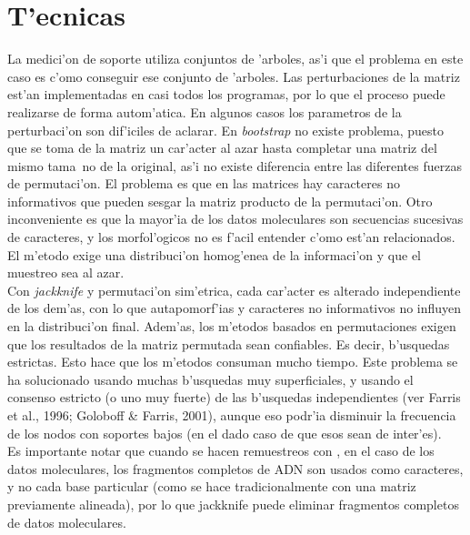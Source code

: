 \section{T'ecnicas}
La medici'on de soporte utiliza conjuntos de 'arboles, as'i que el problema en este caso es c'omo conseguir ese conjunto de 'arboles. Las perturbaciones de la matriz est'an implementadas en casi todos los programas, por lo que el proceso puede realizarse de forma autom'atica. En algunos casos los parametros de la perturbaci'on son dif'iciles de aclarar. En \textit{bootstrap} no existe problema, puesto que se toma de la matriz un car'acter al azar hasta completar una matriz del mismo tama~no de la original, as'i no existe diferencia entre las diferentes fuerzas de permutaci'on. El problema es que en las matrices hay caracteres no informativos que pueden sesgar la matriz producto de la permutaci'on. Otro inconveniente es que la mayor'ia de los datos moleculares son secuencias sucesivas de caracteres, y los morfol'ogicos no es f'acil entender c'omo est'an relacionados. El m'etodo exige una distribuci'on homog'enea de la informaci'on y que el muestreo sea al azar.\\
Con \textit{jackknife} y permutaci'on sim'etrica, cada car'acter es alterado independiente de los dem'as, con lo que autapomorf'ias y caracteres no informativos no influyen en la distribuci'on final. Adem'as, los m'etodos basados en permutaciones exigen que los resultados de la matriz permutada sean confiables. Es decir, b'usquedas estrictas. Esto hace que los m'etodos consuman mucho tiempo. Este problema se ha solucionado usando muchas b'usquedas muy superficiales, y usando el consenso estricto (o uno muy fuerte) de las b'usquedas independientes (ver Farris et al., 1996; Goloboff \& Farris, 2001), aunque eso podr'ia disminuir la frecuencia de los nodos con soportes bajos (en el dado caso de que esos sean de inter'es).\\
Es importante notar que cuando se hacen remuestreos con , en el caso de los datos moleculares, los fragmentos completos de ADN son usados como caracteres, y no cada base particular (como se hace tradicionalmente con una matriz previamente alineada), por lo que jackknife puede eliminar fragmentos completos de datos moleculares.\\
